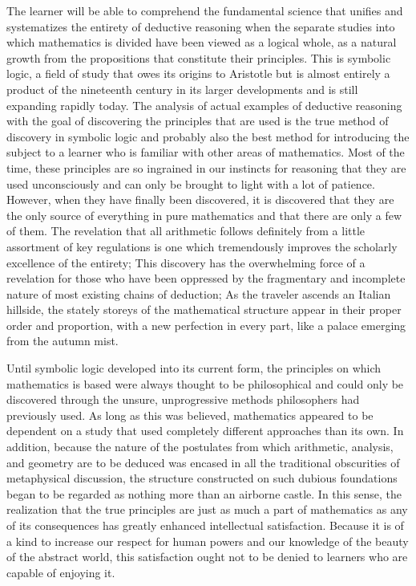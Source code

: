 \documentclass[a4paper,12pt]{book}[2004/02/16]
\theoremstyle{ilemma}
\theoremstyle{itheorem}
\theoremstyle{iother}
\theoremstyle{icorollary}
\theoremstyle{numcorollary}
\theoremstyle{idefinition}
\begin{document}
The learner will be able to comprehend the fundamental science that unifies and systematizes the entirety of deductive reasoning when the separate studies into which mathematics is divided have been viewed as a logical whole, as a natural growth from the propositions that constitute their principles. This is symbolic logic, a field of study that owes its origins to Aristotle but is almost entirely a product of the nineteenth century in its larger developments and is still expanding rapidly today. The analysis of actual examples of deductive reasoning with the goal of discovering the principles that are used is the true method of discovery in symbolic logic and probably also the best method for introducing the subject to a learner who is familiar with other areas of mathematics. Most of the time, these principles are so ingrained in our instincts for reasoning that they are used unconsciously and can only be brought to light with a lot of patience. However, when they have finally been discovered, it is discovered that they are the only source of everything in pure mathematics and that there are only a few of them. The revelation that all arithmetic follows definitely
from a little assortment of key regulations is one which tremendously
improves the scholarly excellence of the entirety; This discovery has the overwhelming force of a revelation for those who have been oppressed by the fragmentary and incomplete nature of most existing chains of deduction; As the traveler ascends an Italian hillside, the stately storeys of the mathematical structure appear in their proper order and proportion, with a new perfection in every part, like a palace emerging from the autumn mist.

Until symbolic logic developed into its current form, the principles on which mathematics is based were always thought to be philosophical and could only be discovered through the unsure, unprogressive methods philosophers had previously used. As long as this was believed, mathematics appeared to be dependent on a study that used completely different approaches than its own. In addition, because the nature of the postulates from which arithmetic, analysis, and geometry are to be deduced was encased in all the traditional obscurities of metaphysical discussion, the structure constructed on such dubious foundations began to be regarded as nothing more than an airborne castle.
In this sense, the realization that the true principles are just as much a part of mathematics as any of its consequences has greatly enhanced intellectual satisfaction. Because it is of a kind to increase our respect for human powers and our knowledge of the beauty of the abstract world, this satisfaction ought not to be denied to learners who are capable of enjoying it.
\end{document}
